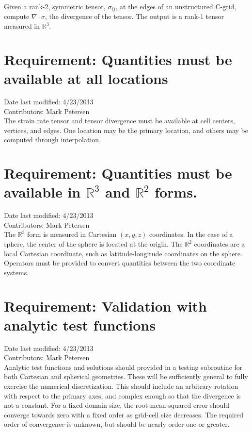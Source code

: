 \documentclass[11pt]{report}
\begin{document}
Given a rank-2, symmetric tensor, $\sigma_{ij}$, at the edges of an unstructured C-grid, compute $\nabla\cdot\sigma$, the divergence of the tensor.  The output is a rank-1 tensor measured in $\mathbb{R}^3$.

\section{Requirement: Quantities must be available at all locations}
Date last modified: 4/23/2013 \\
Contributors: Mark Petersen \\

The strain rate tensor and tensor divergence must be available at cell centers, vertices, and edges.  One location may be the primary location, and others may be computed through interpolation.

\section{Requirement: Quantities must be available in $\mathbb{R}^3$ and $\mathbb{R}^2$ forms.}
Date last modified: 4/23/2013 \\
Contributors: Mark Petersen \\

The $\mathbb{R}^3$ form is measured in Cartesian $(x,y,z)$ coordinates.  In the case of a sphere, the center of the sphere is located at the origin.  The $\mathbb{R}^2$ coordinates are a local Cartesian coordinate, such as latitude-longitude coordinates on the sphere.  Operators must be provided to convert quantities between the two coordinate systems.

\section{Requirement: Validation with analytic test functions}
Date last modified: 4/23/2013 \\
Contributors: Mark Petersen \\

Analytic test functions and solutions should provided in a testing subroutine for both Cartesian and spherical geometries.  These will be sufficiently general to fully exercise the numerical discretization.  This should include an arbitrary rotation with respect to the primary axes, and complex enough so that the divergence is not a constant.  For a fixed domain size, the root-mean-squared error should converge towards zero with a fixed order as grid-cell size decreases.  The required order of convergence is unknown, but should be nearly order one or greater.
\end{document}
